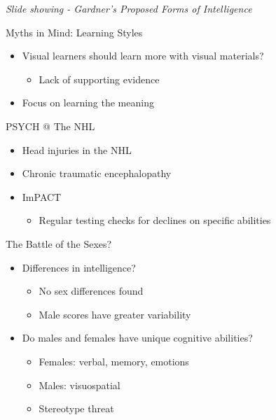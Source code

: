 \documentclass[
]{book}
\providecommand{\tightlist}{%
  \setlength{\itemsep}{0pt}\setlength{\parskip}{0pt}}
\begin{document}
\begin{reflect}
\emph{Slide showing - Gardner's Proposed Forms of Intelligence}

Myths in Mind: Learning Styles

\begin{itemize}
\tightlist
\item
  Visual learners should learn more with visual materials?

  \begin{itemize}
  \tightlist
  \item
    Lack of supporting evidence\\
  \end{itemize}
\item
  Focus on learning the meaning
\end{itemize}

PSYCH @ The NHL

\begin{itemize}
\tightlist
\item
  Head injuries in the NHL\\
\item
  Chronic traumatic encephalopathy\\
\item
  ImPACT

  \begin{itemize}
  \tightlist
  \item
    Regular testing checks for declines on specific abilities
  \end{itemize}
\end{itemize}

The Battle of the Sexes?

\begin{itemize}
\tightlist
\item
  Differences in intelligence?

  \begin{itemize}
  \tightlist
  \item
    No sex differences found\\
  \item
    Male scores have greater variability
  \end{itemize}
\item
  Do males and females have unique cognitive abilities?

  \begin{itemize}
  \tightlist
  \item
    Females: verbal, memory, emotions\\
  \item
    Males: visuospatial\\
  \item
    Stereotype threat
  \end{itemize}
\end{itemize}


\end{reflect}
\end{document}
